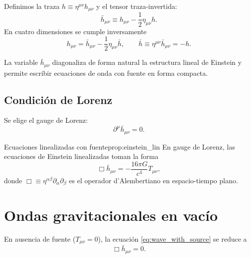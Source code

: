 Definimos la traza $h\equiv \eta^{\mu\nu}h_{\mu\nu}$ y el tensor traza-invertida:
\begin{equation}
  \bar h_{\mu\nu}\equiv h_{\mu\nu}-\frac{1}{2}\eta_{\mu\nu}h.
\end{equation}
En cuatro dimensiones se cumple inversamente
\begin{equation}
  h_{\mu\nu}=\bar h_{\mu\nu}-\frac{1}{2}\eta_{\mu\nu}\bar h,
  \qquad
  \bar h\equiv\eta^{\mu\nu}\bar h_{\mu\nu}=-h.
\end{equation}

\begin{importante}
La variable $\bar h_{\mu\nu}$ diagonaliza de forma natural la estructura lineal de Einstein y permite escribir ecuaciones de onda con fuente en forma compacta.
\end{importante}

\subsection{Condición de Lorenz}

Se elige el gauge de Lorenz:
\begin{equation}
  \partial^{\mu}\bar h_{\mu\nu}=0.
  \label{eq:lorenz_gauge}
\end{equation}

\begin{proposicion}{Ecuaciones linealizadas con fuente}{prop:einstein_lin}
En gauge de Lorenz, las ecuaciones de Einstein linealizadas toman la forma
\begin{equation}
  \Box\bar h_{\mu\nu}=-\frac{16\pi G}{c^4}T_{\mu\nu},
  \label{eq:wave_with_source}
\end{equation}
donde $\Box\equiv \eta^{\alpha\beta}\partial_\alpha\partial_\beta$ es el operador d'Alembertiano en espacio-tiempo plano.
\end{proposicion}

\section{Ondas gravitacionales en vacío}
\label{sec:ondas_vacio}

En ausencia de fuente ($T_{\mu\nu}=0$), la ecuación \eqref{eq:wave_with_source} se reduce a
\begin{equation}
  \Box\bar h_{\mu\nu}=0.
  \label{eq:wave_vacuum}
\end{equation}

